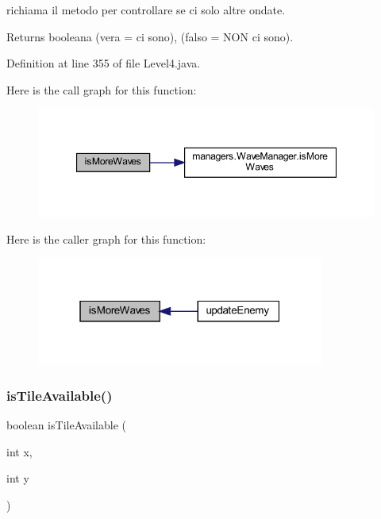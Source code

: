 richiama il metodo per controllare se ci solo altre ondate. 

\begin{DoxyReturn}{Returns}
booleana (vera = ci sono), (falso = N\+ON ci sono). 
\end{DoxyReturn}


Definition at line 355 of file Level4.\+java.

Here is the call graph for this function\+:
\nopagebreak
\begin{figure}[H]
\begin{center}
\leavevmode
\includegraphics[width=347pt]{classscenes_1_1_level4_a999f12a033f49f299ad7f55bcae24447_cgraph}
\end{center}
\end{figure}
Here is the caller graph for this function\+:\nopagebreak
\begin{figure}[H]
\begin{center}
\leavevmode
\includegraphics[width=268pt]{classscenes_1_1_level4_a999f12a033f49f299ad7f55bcae24447_icgraph}
\end{center}
\end{figure}
\mbox{\label{classscenes_1_1_level4_aaeac2ee6b3a920a21928ee7b3dc8e7a9}} 
\subsubsection{\texorpdfstring{is\+Tile\+Available()}{isTileAvailable()}}
{\footnotesize\ttfamily boolean is\+Tile\+Available (\begin{DoxyParamCaption}\item[{int}]{x,  }\item[{int}]{y }\end{DoxyParamCaption})\hspace{0.3cm}{\ttfamily [private]}}



